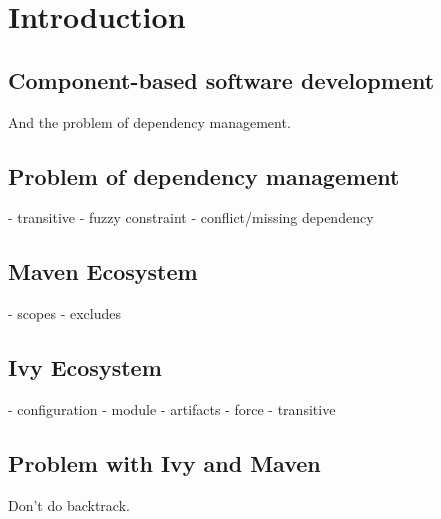 \section{Introduction}

\subsection{Component-based software development}

And the problem of dependency management.

\subsection{Problem of dependency management}

- transitive
- fuzzy constraint
- conflict/missing dependency

\subsection{Maven Ecosystem}

- scopes
- excludes

\subsection{Ivy Ecosystem}

- configuration
- module
- artifacts
- force
- transitive

\subsection{Problem with Ivy and Maven}

Don't do backtrack.
